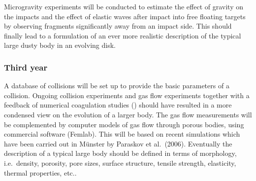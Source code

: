 Microgravity experiments will be conducted to estimate the effect of gravity
on the impacts and the effect of elastic waves after impact into free
floating targets by observing fragments significantly away from an impact
side. This should finally lead to a formulation of an ever more realistic
description of the typical large dusty body in an evolving disk.

\subsubsection{Third year}

A database of collisions will be set up to provide the basic parameters of a
collision.  Ongoing collision experiments and gas flow experiments together
with a feedback of numerical coagulation studies (\projdul{}) should have
resulted in a more condensed view on the evolution of a larger body. The gas
flow measurements will be complemented by computer models of gas flow
through porous bodies, using commercial software (Femlab). This will be
based on recent simulations which have been carried out in M\"unster by
Paraskov et al.~(2006).  Eventually the description of a typical large body
should be defined in terms of morphology, i.e.\ density, porosity, pore
sizes, surface structure, tensile strength, elasticity, thermal properties,
etc..


